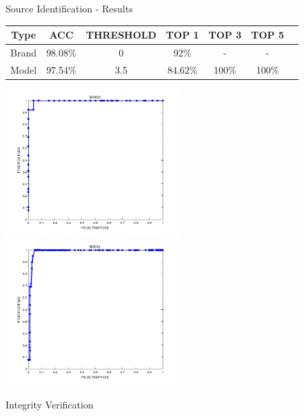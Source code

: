 \begin{tframe}{Source Identification - Results}

\begin{footnotesize}
\begin{table}[h!]
\centering
\begin{tabular}{c c c c c c c} 
\hline \hline 
\textbf{Type} & \textbf{ACC} & \textbf{THRESHOLD} & \textbf{TOP 1} & \textbf{TOP 3} & \textbf{TOP 5}\\ [0.5ex]
\hline

Brand & 98.08\% & 0 & 92\% & - & - \\
Model & 97.54\% & 3.5 & 84.62\% & 100\% & 100\% \\

\hline
\end{tabular}
\end{table}
\end{footnotesize}

\vspace{0.1cm}
    
\includegraphics[width=0.5\textwidth]{images/brand-plot-label.png}
\includegraphics[width=0.5\textwidth]{images/model-plot-label.png}

\end{tframe}

\begin{tframe}{Integrity Verification}

\vspace{0.2cm}







\end{tframe}

